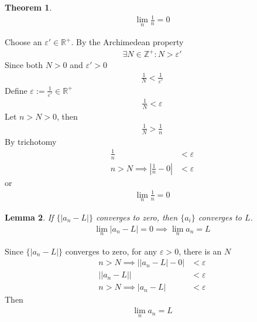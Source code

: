 \documentclass{amsart}
\numberwithin{equation}{section}
\let\oldendproof\endproof
\renewenvironment{proof}[1][\proofname]{%
  \setcounter{case}{0}
  \setcounter{step}{0}
  \oldproof[#1]%
}{\oldendproof}
\theoremstyle{plain}
\newtheorem{theorem}{Theorem}[section]
\newtheorem{lemma}[theorem]{Lemma}
\theoremstyle{definition}
\theoremstyle{remark}
\begin{document}
\begin{theorem}
  \begin{align}
    \lim_n \frac{1}{n} = 0
  \end{align}
\end{theorem}
\begin{proof}
  Choose an $\varepsilon' \in \mathbb{R}^+$.
  By the Archimedean property
  \begin{align}
    \exists N \in \mathbb{Z}^+: N > \varepsilon '
  \end{align}
  Since both $N>0$ and $\varepsilon'>0$
  \begin{align}
    \frac{1}{N} < \frac{1}{\varepsilon'}
  \end{align}
  Define $\varepsilon:= \frac{1}{\varepsilon'} \in\mathbb{R}^+$
  \begin{align}
    \frac{1}{N} < \varepsilon
  \end{align}
  Let $n>N>0$, then
  \begin{align}
    \frac{1}{N} > \frac{1}{n}
  \end{align}
  By trichotomy
  \begin{align}
    \frac{1}{n} &< \varepsilon\\
    n>N \implies \left| \frac{1}{n} - 0 \right| &< \varepsilon
  \end{align}
  or
  \begin{align}
    \lim_n \frac{1}{n} = 0
  \end{align}
\end{proof}

\begin{lemma}\label{Lemma:ExponentialConvergentSequence}
  If $\{|a_n-L|\}$ converges to zero, then $\{a_i\}$ converges to $L$.
  \begin{align}
    \lim_n |a_n-L| = 0 \implies \lim_n a_n = L
  \end{align}
\end{lemma}
\begin{proof}
  Since $\{|a_n-L|\}$ converges to zero, for any $\varepsilon>0$, there is an $N$
  \begin{align}
    n> N \implies \left| |a_n- L | - 0\right|&< \varepsilon\\
    \left| |a_n - L | \right|&< \varepsilon\\
    n>N\implies |a_n-L| &< \varepsilon
  \end{align}
  Then
  \begin{align}
    \lim_n a_n = L
  \end{align}
\end{proof}
\end{document}
